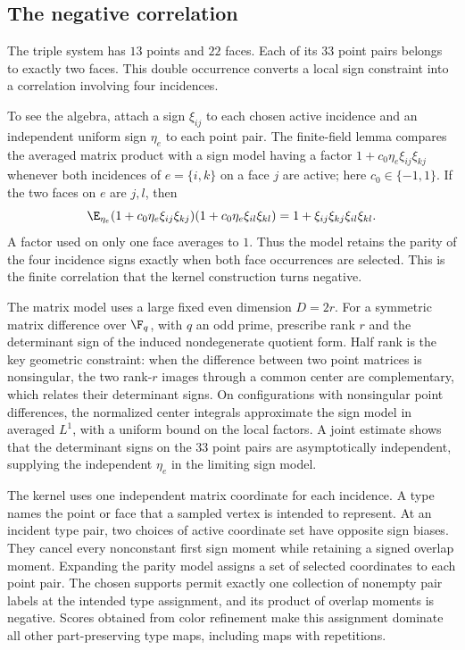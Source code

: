 \subsection*{The negative correlation}

The triple system has \(13\) points and \(22\) faces. Each of its
\(33\) point pairs belongs to exactly two faces. This double
occurrence converts a local sign constraint into a correlation
involving four incidences.

To see the algebra, attach a sign \(\xi_{ij}\) to each chosen active
incidence and an independent uniform sign \(\eta_e\) to each point
pair. The finite-field lemma compares the averaged matrix product with
a sign model having a factor
\(1+c_0\eta_e\xi_{ij}\xi_{kj}\) whenever both incidences of
\(e=\{i,k\}\) on a face \(j\) are active; here
\(c_0\in\{-1,1\}\). If the two faces on \(e\) are \(j,l\), then
\[
 \E_{\eta_e}
 (1+c_0\eta_e\xi_{ij}\xi_{kj})
 (1+c_0\eta_e\xi_{il}\xi_{kl})
 =
 1+\xi_{ij}\xi_{kj}\xi_{il}\xi_{kl}.
\]
A factor used on only one face averages to \(1\). Thus the model
retains the parity of the four incidence signs exactly when both
face occurrences are selected. This is the finite correlation that
the kernel construction turns negative.

The matrix model uses a large fixed even dimension \(D=2r\).
For a symmetric matrix difference over \(\F_q\), with \(q\) an odd
prime, prescribe rank \(r\)
and the determinant sign of the induced nondegenerate quotient form.
Half rank is the key geometric constraint: when the difference
between two point matrices is nonsingular, the two rank-\(r\) images
through a common center are complementary, which relates their
determinant signs. On configurations with nonsingular point
differences, the normalized center integrals approximate the sign
model in averaged \(L^1\), with a uniform bound on the local factors.
A joint estimate shows that the determinant signs on the \(33\) point
pairs are asymptotically independent, supplying the independent
\(\eta_e\) in the limiting sign model.

The kernel uses one independent matrix coordinate for each incidence.
A type names the point or face that a sampled vertex is intended to
represent. At an incident type pair, two choices of active coordinate
set have opposite sign biases. They cancel every nonconstant first
sign moment while retaining a signed overlap moment. Expanding the
parity model assigns a set of selected coordinates to each point
pair. The chosen supports permit exactly one collection of nonempty
pair labels at the intended type assignment, and its product of
overlap moments is negative. Scores obtained from color refinement
make this assignment dominate all other part-preserving type maps,
including maps with repetitions.

